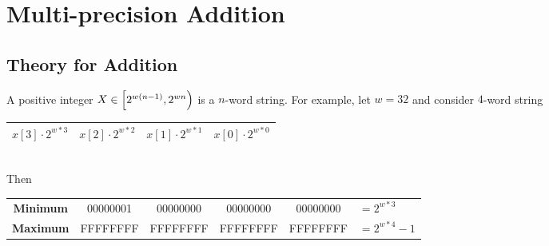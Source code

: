 \newpage
\section{Multi-precision Addition}

\subsection{Theory for Addition}

\begin{note}
A positive integer $X\in\intco{2^{w(n-1)}, 2^{wn}}$ is a $n$-word string. For example, let $w=32$ and consider $4$-word string
\begin{table}[h!]\centering\renewcommand{\arraystretch}{1.25}
\begin{tabular}{|c|c|c|c|}
\hline
$x[3]\cdot 2^{w*3}$ & $x[2]\cdot 2^{w*2}$ & $x[1]\cdot 2^{w*1}$ & $x[0]\cdot 2^{w*0}$\\
\hline
\end{tabular}
\end{table}\\
Then
\begin{table}[h!]\centering\renewcommand{\arraystretch}{1.25}
{\ttfamily\begin{tabular}{c|c|c|c|c|l}
\cline{2-5}
\textnormal{\bf Minimum} & 00000001 & 00000000 & 00000000 & 00000000 & $=2^{w*3}$\\ \cline{2-5}
\textnormal{\bf Maximum} & FFFFFFFF & FFFFFFFF & FFFFFFFF & FFFFFFFF & $=2^{w*4}-1$\\ \cline{2-5}
\end{tabular}}
\end{table}
\end{note}

